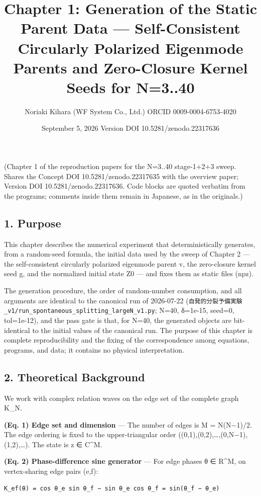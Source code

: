 \documentclass[
  a4paper,
]{ltjsarticle}
\title{Chapter 1: Generation of the Static Parent Data ---
Self-Consistent Circularly Polarized Eigenmode Parents and Zero-Closure
Kernel Seeds for N=3..40}
\author{Noriaki Kihara (WF System Co., Ltd.) ORCID 0009-0004-6753-4020}
\date{September 5, 2026 Version DOI 10.5281/zenodo.22317636}
\begin{document}
\maketitle

(Chapter 1 of the reproduction papers for the N=3..40 stage-1+2+3 sweep.
Shares the Concept DOI 10.5281/zenodo.22317635 with the overview paper;
Version DOI 10.5281/zenodo.22317636. Code blocks are quoted verbatim
from the programs; comments inside them remain in Japanese, as in the
originals.)

\subsection{1. Purpose}\label{purpose}

This chapter describes the numerical experiment that deterministically
generates, from a random-seed formula, the initial data used by the
sweep of Chapter 2 --- the self-consistent circularly polarized
eigenmode parent v, the zero-closure kernel seed g, and the normalized
initial state Z0 --- and fixes them as static files (npz).

The generation procedure, the order of random-number consumption, and
all arguments are identical to the canonical run of 2026-07-22
(\texttt{自発的分裂予備実験\_v1/run\_spontaneous\_splitting\_largeN\_v1.py};
N=40, δ=1e-15, seed=0, tol=1e-12), and the pass gate is that, for N=40,
the generated objects are bit-identical to the initial values of the
canonical run. The purpose of this chapter is complete reproducibility
and the fixing of the correspondence among equations, programs, and
data; it contains no physical interpretation.

\subsection{2. Theoretical Background}\label{theoretical-background}

We work with complex relation waves on the edge set of the complete
graph K\_N.

\textbf{(Eq. 1) Edge set and dimension} --- The number of edges is M =
N(N−1)/2. The edge ordering is fixed to the upper-triangular order
((0,1),(0,2),\ldots,(0,N−1),(1,2),\ldots). The state is z ∈ C\^{}M.

\textbf{(Eq. 2) Phase-difference sine generator} --- For edge phases θ ∈
R\^{}M, on vertex-sharing edge pairs (e,f):

\begin{verbatim}
K_ef(θ) = cos θ_e sin θ_f − sin θ_e cos θ_f = sin(θ_f − θ_e)
\end{verbatim}
\end{document}
